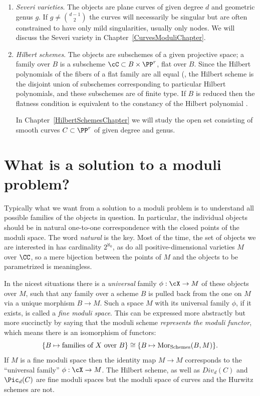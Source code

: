 \begin{enumerate}
\item \emph{Severi varieties}. The objects are plane curves
of given degree $d$ and geometric genus $g$. If $g \neq {d-1\choose 2}$
the curves will necessarily be singular but are often
constrained to have only mild singularities, usually only nodes. We will discuss the Severi variety in Chapter~\ref{CurvesModuliChapter}.

\item \emph{Hilbert schemes}. The objects are subschemes of a given projective space;   a family over $B$ is a subscheme $\cC \subset B \times \PP^r$, flat over $B$. Since the Hilbert polynomials of the fibers of a flat family are all equal (\cite[Section III.9]{Hartshorne1977}, the Hilbert scheme is the disjoint union of subschemes corresponding to particular Hilbert polynomials, and these subschemes are of finite type.
If $B$ is reduced then the flatness condition is equivalent to the  constancy of the Hilbert polynomial \cite[]{Hartshorne1977}.

In Chapter~\ref{HilbertSchemesChapter} we will study the
open set consisting of smooth curves $C\subset \PP^{r}$ of given degree and genus.

\end{enumerate}

\section{What is a solution to a moduli problem?}

Typically what we want from a solution to a moduli problem is to understand all possible families of the objects
in question. In particular, the individual objects should be in natural one-to-one correspondence with the closed points of the
moduli space.  The word \emph{natural} is the key. Most of the time, the set of objects we are interested in has cardinality $2^{\aleph_0}$, as do all positive-dimensional varieties $M$ over $\CC$, so a mere  bijection between the points of $M$ and the objects to be parametrized is meaningless.

In the nicest situations there is a \emph{universal} family $\phi: \cX\to M$ of these objects over $M$,
such that any family over a scheme $B$  is pulled back from the one on $M$ via a unique morphism $B\to M.$  Such a space $M$ with its universal family $\phi$, if it exists, is called a \emph{fine moduli space}. This can be expressed more abstractly but more succinctly by saying that the moduli scheme \emph{represents the moduli functor}, which means there is an isomorphism of functors:
$$
\{ B \mapsto \text{families of } X \text{ over } B \} \cong \{ B\mapsto {\rm{Mor}}_{{\rm Schemes}}(B, M) \}.
$$
If $M$ is a fine moduli space then the identity map $M\to M$ corresponds to the ``universal family'' $\phi: \cX \to M$. 
The Hilbert scheme, as well as $Div_d(C)$ and $\Pic_d(C)$ are fine moduli spaces but the moduli space of curves
and the Hurwitz schemes are not.

